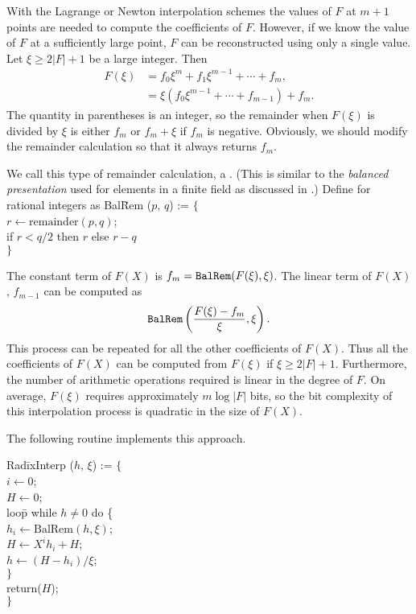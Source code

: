 With the Lagrange or Newton interpolation schemes the values of $F$ at
$m+1$ points are needed to compute the coefficients of $F$.  However,
if we know the value of $F$ at a sufficiently large point, $F$ can be 
reconstructed using only a single value.  Let $\xi \ge 2 |F| + 1$ be a
large integer.  Then
\[
\begin {aligned}
  F(\xi) & = f_0 \xi^m + f_1 \xi^{m-1} + \cdots + f_m, \\
      & = \xi (f_0 \xi^{m-1} + \cdots + f_{m-1}) + f_m.
\end{aligned}
\]
The quantity in parentheses is an integer, so the remainder when
$F(\xi)$ is divided by $\xi$ is either $f_m$ or $f_m + \xi$ if $f_m$
is negative.  Obviously, we should modify the remainder calculation so
that it always returns $f_m$.

We call this type of remainder calculation, a .  (This is similar to the {\em balanced presentation} used
for elements in a finite field as discussed in
.)  Define  for rational
integers as 
\begindsacode
Bal\=Rem ($p$, $q$) := $\{$ \\
\> $r \leftarrow \mbox{remainder}(p, q)$; \\
\> if $r < q/2$ then $r$ else $r - q$ \\
\> $\}$ 
\enddsacode

The constant term of $F(X)$ is $f_m = \mbox{\tt BalRem}(F(\xi),
\xi)$.  The linear term of $F(X)$, $f_{m-1}$ can be computed as
\[
\mbox{\tt BalRem}\left( \frac{ F(\xi) - f_m}{\xi}, \xi\right).
\]
This process can be repeated for all the other coefficients of $F(X)$.
Thus all the coefficients of $F(X)$ can be computed from $F(\xi)$ if
$\xi \ge 2 |F| + 1$.  Furthermore, the number of arithmetic operations
required is linear in the degree of $F$.  On average, $F(\xi)$ requires
approximately $m \log |F|$ bits, so the bit complexity of this
interpolation process is quadratic in the size of $F(X)$.

The following routine implements this approach. 

\begindsacode
Rad\=ixInterp ($h$, $\xi$) := $\{$ \\
\> $i \leftarrow 0$; \\
\> $H \leftarrow 0$; \\
\> loo\=p while $h \not= 0$ do \{ \\
\>\> $h_i \leftarrow \mbox{BalRem}(h, \xi)$; \\
\>\> $H \leftarrow X^i h_i + H$; \\
\>\> $h \leftarrow (H - h_i)/\xi$; \\
\>\> $\}$ \\
\> return($H$); \\
\> $\}$
\enddsacode
{}


